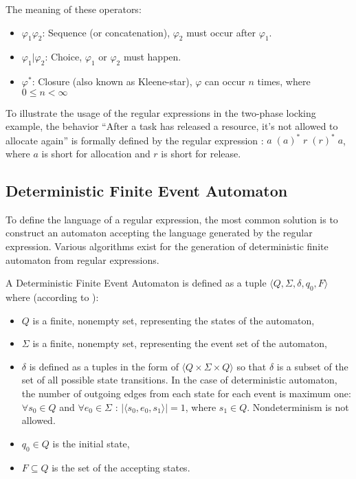 			The meaning of these operators:
			\begin{itemize}
				\item $\varphi_1 \varphi_2$: Sequence (or concatenation), $\varphi_2$ must occur after $\varphi_1$.
				\item $\varphi_1 | \varphi_2$: Choice, $\varphi_1$ or $\varphi_2$ must happen.
				\item $\varphi^\ast$: Closure (also known as Kleene-star), $\varphi$ can occur $n$ times, where $0 \leq n < \infty$
			\end{itemize}
			
	
			To illustrate the usage of the regular expressions in the two-phase locking example, the behavior ``After a task has released a resource, it's not allowed to allocate again'' is formally defined by the regular expression : $a \; (a)^* \; r \; (r)^* \; a $, where $a$ is short for allocation and $r$ is short for release.
	
	
		\subsection{Deterministic Finite Event Automaton}
			To define the language of a regular expression, the most common solution is to construct an automaton accepting the language generated by the regular expression. Various  algorithms exist for the generation of deterministic finite automaton from regular expressions. %
			
			\begin{dfn}
				\label{dfn:cep:ea}
				A Deterministic Finite Event Automaton is defined as a tuple $\langle Q,\Sigma,\delta,q_0, F \rangle$ where (according to \citep{lam2006compilers}): 
					\begin{itemize}
						\item $Q$ is a finite, nonempty set, representing the states of the automaton,
						\item $\Sigma$ is a finite, nonempty set, representing the event set of the automaton,
						\item $\delta$ is defined as a tuples in the form of $\langle Q \times \Sigma \times Q \rangle$ so that $\delta$ is a subset of the set of all possible state transitions. In the case of deterministic automaton, the number of outgoing edges from each state for each event is maximum one: $\forall s_0 \in Q$ and $\forall e_0 \in \Sigma$ : $|\langle s_0, e_0, s_1 \rangle| = 1$, where $s_1 \in Q$. Nondeterminism is not allowed.
						\item $q_0 \in Q$ is the initial state,
						\item $F \subseteq Q$ is the set of the accepting states.
					\end{itemize}	
			\end{dfn}
		
